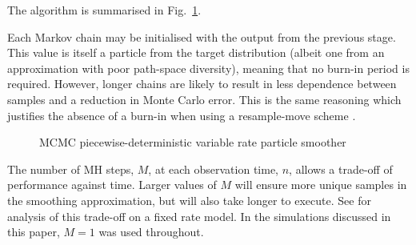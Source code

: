\documentclass[peerreview,11pt,draftcls,onecolumn]{IEEEtran}
\begin{document}
The algorithm is summarised in Fig.~\ref{alg:VRPS}.

Each Markov chain may be initialised with the output from the previous stage. This value is itself a particle from the target distribution (albeit one from an approximation with poor path-space diversity), meaning that no burn-in period is required. However, longer chains are likely to result in less dependence between samples and a reduction in Monte Carlo error. This is the same reasoning which justifies the absence of a burn-in when using a resample-move scheme \cite{Gilks2001}.

\begin{figure}
\caption{MCMC piecewise-deterministic variable rate particle smoother}
\label{alg:VRPS}
\end{figure}

The number of MH steps, $M$, at each observation time, $n$, allows a trade-off of performance against time. Larger values of $M$ will ensure more unique samples in the smoothing approximation, but will also take longer to execute. See \cite{Bunch2012} for analysis of this trade-off on a fixed rate model. In the simulations discussed in this paper, $M=1$ was used throughout.
\end{document}
